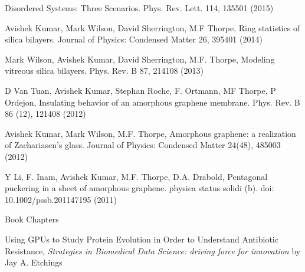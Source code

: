 \begin{cventries}
{\begin{cvitems}
Disordered Systems: Three Scenarios. Phys. Rev. Lett. 114, 135501 (2015)
    \item Avishek Kumar, Mark Wilson, David Sherrington, M.F Thorpe, Ring statistics of silica bilayers.
Journal of Physics: Condensed Matter 26, 395401 (2014)
    \item Mark Wilson, Avishek Kumar, David Sherrington, M.F. Thorpe, Modeling vitreous silica bilayers.
Phys. Rev. B 87, 214108 (2013)
    \item D Van Tuan, Avishek Kumar, Stephan Roche, F. Ortmann, MF Thorpe, P Ordejon, Insulating behavior
of an amorphous graphene membrane. Phys. Rev. B 86 (12), 121408 (2012)
    \item Avishek Kumar, Mark Wilson, M.F. Thorpe, Amorphous graphene: a realization of Zachariasen’s
glass. Journal of Physics: Condensed Matter 24(48), 485003 (2012)
    \item Y Li, F. Inam, Avishek Kumar, M.F. Thorpe, D.A. Drabold, Pentagonal puckering in a sheet of
amorphous graphene. physica status solidi (b). doi: 10.1002/pssb.201147195 (2011)
\end{cvitems}
}

\cventry{}
    {Book Chapters}
    {}
    {}
    {\begin{cvitems}
    \vspace{-1\baselineskip}
    \setlength\itemsep{.5em}
    \item Using GPUs to Study Protein Evolution in Order to Understand Antibiotic Resistance, \textit{Strategies in Biomedical Data Science: driving force for innovation} by Jay A. Etchings
\end{cvitems}}




\end{cventries}
